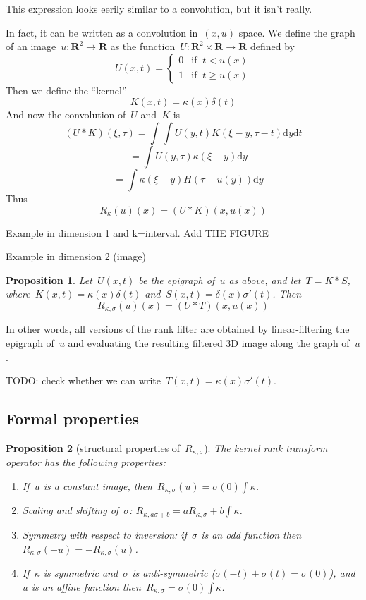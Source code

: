 \documentclass[12pt]{article}                  %
\newtheorem{proposition}{Proposition}
\begin{document}
This expression looks eerily similar to a convolution, but it isn't really.

In fact, it can be written as a convolution in~$(x,u)$ space.  We define the
graph of an image~$u:\mathbf{R}^2\to\mathbf{R}$ as the
function~$U:\mathbf{R}^2\times\mathbf{R}\to\mathbf{R}$ defined by
\[
	U(x,t) = \begin{cases}
		0 & \textrm{if $\ t< u(x)$} \\
		1 & \textrm{if $\ t\ge u(x)$}
	\end{cases}
\]
Then we define the ``kernel''
\[
	K(x,t) = \kappa(x)\delta(t)
\]
And now the convolution of~$U$ and~$K$ is
\[
	(U*K)(\xi,\tau)
	=
	\int
	\int U\left(y,t\right)K\left(\xi-y,\tau-t\right)
		\mathrm{d} y
		\mathrm{d} t
\]
\[
	\quad
	=\int
	U(y,\tau)
	\kappa(\xi - y)
		\mathrm{d} y
\]
\[
	\quad
	=\int\kappa(\xi-y)H(\tau - u(y))
		\mathrm{d} y
\]
Thus
\begin{equation}\label{eq:convolution1}
	R_\kappa(u)(x)=(U*K)(x,u(x))
\end{equation}

Example in dimension 1 and k=interval.  Add THE FIGURE

Example in dimension 2 (image)

\begin{proposition}
Let~$U(x,t)$ be the epigraph of~$u$ as above, and let~$T=K*S$,
where~$K(x,t)=\kappa(x)\delta(t)$ and~$S(x,t)=\delta(x)\sigma'(t)$.  Then
\[
	R_{\kappa,\sigma}(u)(x) = (U*T)(x,u(x))
\]
\end{proposition}
In other words, all versions of the rank filter are obtained by
linear-filtering the epigraph of~$u$ and evaluating the resulting filtered
3D image along the graph of~$u$.

TODO: check whether we can write~$T(x,t)=\kappa(x)\sigma'(t)$.

\subsection{Formal properties}


\begin{proposition}[structural properties of~$R_{\kappa,\sigma}$]
	The kernel rank transform operator has the following properties:
	\begin{enumerate}
		\item[\bf P1] If~$u$ is a constant image,
			then~$R_{\kappa,\sigma}(u)=\sigma(0)\int\kappa$.
		\item[\bf P2] Scaling and shifting of~$\sigma$:
			$R_{\kappa,a\sigma+b}=aR_{\kappa,\sigma}+b\int\kappa$.
		\item[\bf P3] Symmetry with respect to inversion: if~$\sigma$
			is an odd function
			then~$R_{\kappa,\sigma}(-u)=-R_{\kappa,\sigma}(u)$.
		\item[\bf P4] If~$\kappa$ is symmetric and~$\sigma$ is
			anti-symmetric ($\sigma(-t)+\sigma(t)=\sigma(0)$),
			and~$u$ is an affine function
			then~$R_{\kappa,\sigma}=\sigma(0)\int\kappa$.
	\end{enumerate}
\end{proposition}
\end{document}
